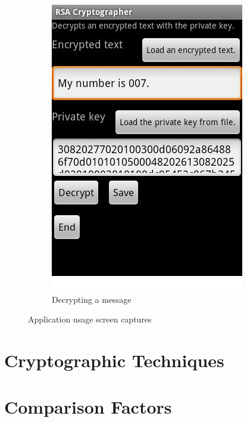 \documentclass[a4paper,10pt]{report}
\begin{document}
\begin{figure}
\begin{subfigure}[b]{0.45\textwidth}
                \includegraphics[width=\textwidth]{cat1.jpg}
                \caption{Decrypting a message}
                \label{fig:cat1}
        \end{subfigure}
        \caption{Application usage screen captures}\label{fig:ciphercat}
\end{figure}

\section{Cryptographic Techniques}

\section{Comparison Factors}
\end{document}
